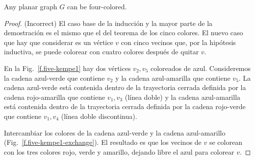{{\begin{theorem}\label{thm.fourcolor}
Any planar graph $G$ can be four-colored.
\end{theorem}

\begin{proof} (Incorrect) El caso base de la inducción y la mayor parte de la demostración es el mismo que el del teorema de los cinco colores. El nuevo caso que hay que considerar es un vértice $v$ con cinco vecinos que, por la hipótesis inductiva, se puede colorear con cuatro colores después de quitar $v$.

En la Fig.~\ref{f.five-kempe1} hay dos vértices $v_2,v_5$ coloreados de azul. Consideremos la cadena azul-verde que contiene $v_2$ y la cadena azul-amarilla que contiene $v_5$. La cadena azul-verde está contenida dentro de la trayectoria cerrada definida por la cadena rojo-amarilla que contiene $v_1,v_3$ (línea doble) y la cadena azul-amarilla está contenida dentro de la trayectoria cerrada definida por la cadena rojo-verde que contiene $v_1,v_4$ (línea doble discontinua).

Intercambiar los colores de la cadena azul-verde y la cadena azul-amarillo (Fig.~\ref{f.five-kempe1-exchange}). El resultado es que los vecinos de $v$ se colorean con los tres colores rojo, verde y amarillo, dejando libre el azul para colorear $v$.
\end{proof}

\begin{figure}[ht]
\begin{minipage}{.45\textwidth}
\begin{center}
\end{center}
\end{minipage}
\end{figure}}}
